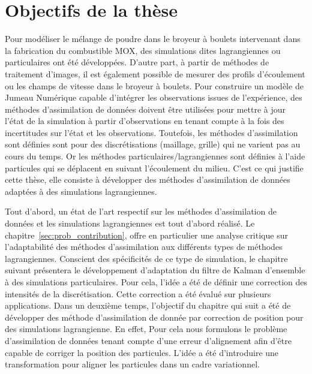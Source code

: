 

\section{Objectifs de la thèse}

Pour modéliser le mélange de poudre dans le broyeur à boulets intervenant dans la fabrication du combustible MOX, des simulations dites lagrangiennes ou particulaires ont été développées. D'autre part, à partir de méthodes de traitement d'images, il est également possible de mesurer des profils d'écoulement ou les champs de vitesse dans le broyeur à boulets. Pour construire un modèle de Jumeau Numérique capable d’intégrer les observations issues de l’expérience, des méthodes d'assimilation de données doivent être utilisées pour mettre à jour l'état de la simulation à partir d'observations en tenant compte à la fois des incertitudes sur l’état et les observations. Toutefois, les méthodes d'assimilation sont définies sont pour des discrétisations (maillage, grille) qui ne varient pas au cours du temps. Or les méthodes particulaires/lagrangiennes sont définies à l’aide particules qui se déplacent en suivant l’écoulement du milieu.
C'est ce qui justifie cette thèse, elle consiste à développer des méthodes d'assimilation de données adaptées à des simulations lagrangiennes.

Tout d'abord, un état de l'art respectif sur les méthodes d'assimilation de données et les simulations lagrangiennes est tout d'abord réalisé. Le chapitre~\ref{sec:prob_contribution}, offre en particulier une analyse critique sur l'adaptabilité des méthodes d'assimilation aux différents types de méthodes lagrangiennes.
Conscient des spécificités de ce type de simulation, le chapitre suivant présentera le développement d'adaptation du filtre de Kalman d'ensemble à des simulations particulaires. Pour cela, l'idée a été de définir une correction des intensités de la discrétisation. Cette correction a été évalué sur plusieurs applications.
Dans un deuxième temps, l'objectif du chapitre qui suit a été de développer des méthode d'assimilation de donnée par correction de position pour des simulations lagrangienne. En effet, Pour cela nous formulons le problème d'assimilation de données tenant compte d'une erreur d'alignement afin d'être capable de corriger la position des particules. L'idée a été d'introduire une transformation pour aligner les particules dans un cadre variationnel.
